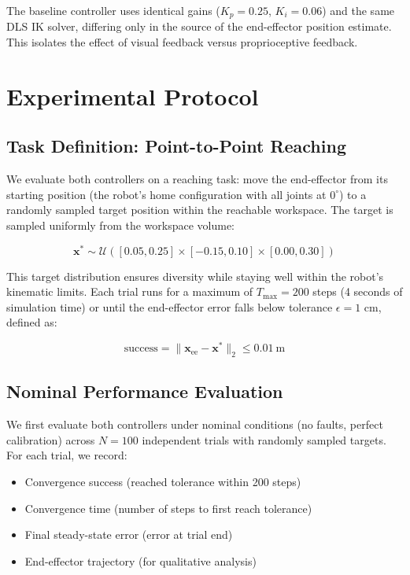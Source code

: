\documentclass[12pt,a4paper,oneside]{report}
\begin{document}
The baseline controller uses identical gains ($K_p = 0.25$, $K_i = 0.06$) and the same DLS IK solver, differing only in the source of the end-effector position estimate. This isolates the effect of visual feedback versus proprioceptive feedback.

\section{Experimental Protocol}

\subsection{Task Definition: Point-to-Point Reaching}

We evaluate both controllers on a reaching task: move the end-effector from its starting position (the robot's home configuration with all joints at $0^\circ$) to a randomly sampled target position within the reachable workspace. The target is sampled uniformly from the workspace volume:

\begin{equation}
\mathbf{x}^* \sim \mathcal{U}([0.05, 0.25] \times [-0.15, 0.10] \times [0.00, 0.30])
\end{equation}

This target distribution ensures diversity while staying well within the robot's kinematic limits. Each trial runs for a maximum of $T_{\text{max}} = 200$ steps (4 seconds of simulation time) or until the end-effector error falls below tolerance $\epsilon = 1$ cm, defined as:

\begin{equation}
\text{success} = \|\mathbf{x}_{\text{ee}} - \mathbf{x}^*\|_2 \leq 0.01\ \text{m}
\end{equation}

\subsection{Nominal Performance Evaluation}

We first evaluate both controllers under nominal conditions (no faults, perfect calibration) across $N = 100$ independent trials with randomly sampled targets. For each trial, we record:

\begin{itemize}
    \item Convergence success (reached tolerance within 200 steps)
    \item Convergence time (number of steps to first reach tolerance)
    \item Final steady-state error (error at trial end)
    \item End-effector trajectory (for qualitative analysis)
\end{itemize}
\end{document}
